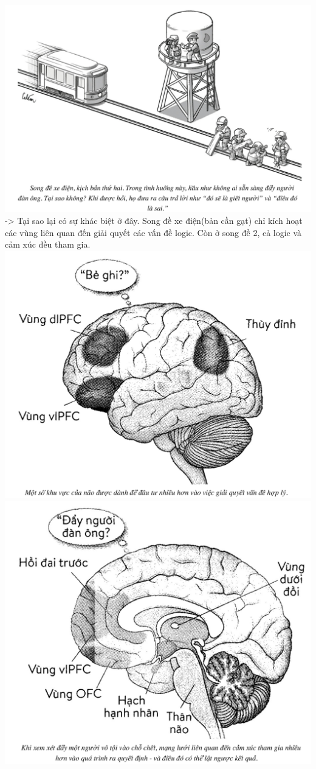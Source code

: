 \documentclass{article}
\newcommand\tab[1][1cm]{\hspace*{#1}}
\begin{document}
\includegraphics[width=\textwidth]{images/songdexedienver2.png}
\tab -> Tại sao lại có sự khác biệt ở đây. Song đề xe điện(bản cần gạt) chỉ kích hoạt các vùng liên quan đến 
giải quyết các vấn đề logic. Còn ở song đề 2, cả logic và cảm xúc đều tham gia.\\
\includegraphics[width=\textwidth]{images/logic.png}
\includegraphics[width=\textwidth]{images/logicemotion.png}
\end{document}

